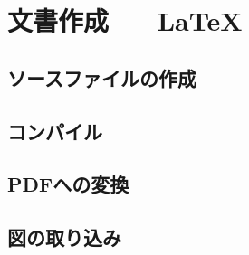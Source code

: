 \documentclass[main]{subfiles}
\begin{document}
\chapter{文書作成  --- \LaTeX}
\section{ソースファイルの作成}
\section{コンパイル}
\section{PDFへの変換}
\section{図の取り込み}
\fontsize{10.2}{10} \selectfont
\end{document}
